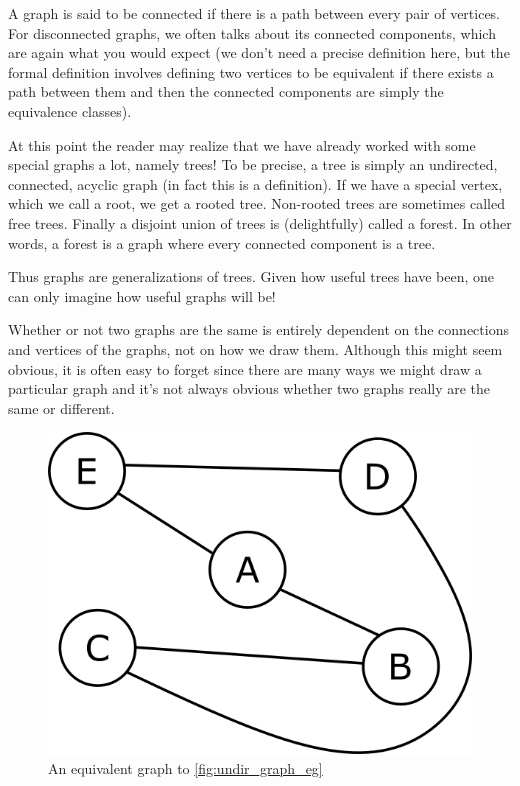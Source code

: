 A graph is said to be connected if there is a path between every pair of vertices. For disconnected graphs, we often talks about its connected components, which are again what you would expect (we don't need a precise definition here, but the formal definition involves defining two vertices to be equivalent if there exists a path between them and then the connected components are simply the equivalence classes).

At this point the reader may realize that we have already worked with some special graphs a lot, namely trees! To be precise, a tree is simply an undirected, connected, acyclic graph (in fact this is a definition). If we have a special vertex, which we call a root, we get a rooted tree. Non-rooted trees are sometimes called free trees. Finally a disjoint union of trees is (delightfully) called a forest. In other words, a forest is a graph where every connected component is a tree.

Thus graphs are generalizations of trees. Given how useful trees have been, one can only imagine how useful graphs will be!

\begin{remark}
    Whether or not two graphs are the same is entirely dependent on the connections and vertices of the graphs, not on how we draw them. Although this might seem obvious, it is often easy to forget since there are many ways we might draw a particular graph and it's not always obvious whether two graphs really are the same or different.
\end{remark}

\begin{figure}[h]
    \centering
    \includegraphics[scale=0.5]{Images/equiv_graph.png}
    \caption{An equivalent graph to \autoref{fig:undir_graph_eg}}
    \label{fig:equiv-graph}
\end{figure}


